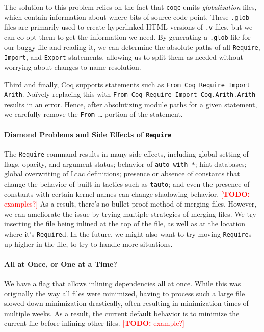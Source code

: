 \documentclass[a4paper,USenglish,cleveref,autoref,thm-restate]{lipics-v2021}
\makeatletter
\newcommand{\todo}[1]{%
\@latex@warning{TODO: \detokenize{#1} on page \thepage}%
\textcolor{red}{[\textbf{TODO:} #1]}}%
\makeatother
\begin{document}
The solution to this problem relies on the fact that \verb|coqc| emits \emph{globalization} files, which contain information about where bits of source code point.
These \verb|.glob| files are primarily used to create hyperlinked HTML versions of \verb|.v| files, but we can co-opt them to get the information we need.
By generating a \verb|.glob| file for our buggy file and reading it, we can determine the absolute paths of all \verb|Require|, \verb|Import|, and \verb|Export| statements, allowing us to split them as needed without worrying about changes to name resolution.

Third and finally, Coq supports statements such as \verb|From Coq Require Import Arith|.
Na\"ively replacing this with \verb|From Coq Require Import Coq.Arith.Arith| results in an error.
Hence, after absolutizing module paths for a given statement, we carefully remove the \texttt{From \ldots} portion of the statement.




\paragraph{Diamond Problems and Side Effects of \texttt{Require}}

The \texttt{Require} command results in many side effects, including global setting of flags, opacity, and argument status; behavior of \texttt{auto with *}; hint databases; global overwriting of Ltac definitions; presence or absence of constants that change the behavior of built-in tactics such as \texttt{tauto}; and even the presence of constants with certain kernel names can change shadowing behavior.
\todo{examples?}
As a result, there's no bullet-proof method of merging files.
However, we can ameliorate the issue by trying multiple strategies of merging files.
We try inserting the file being inlined at the top of the file, as well as at the location where it's \texttt{Require}d.
In the future, we might also want to try moving \texttt{Require}s up higher in the file, to try to handle more situations.

\paragraph{All at Once, or One at a Time?}

We have a flag that allows inlining dependencies all at once.
While this was originally the way all files were minimized, having to process such a large file slowed down minimization drastically, often resulting in minimization times of multiple weeks.
As a result, the current default behavior is to minimize the current file before inlining other files.
\todo{example?}
\end{document}
